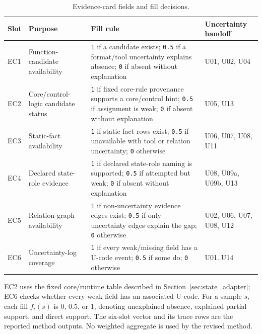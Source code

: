 \documentclass[manuscript,screen,review]{acmart}
\begin{document}
\begin{table}[t]
\centering
\small
\caption{Evidence-card fields and fill decisions.}
\label{tab:s5_1}
\begin{tabularx}{\textwidth}{>{\raggedright\arraybackslash}p{}>{\raggedright\arraybackslash}p{}>{\raggedright\arraybackslash}X>{\raggedright\arraybackslash}p{}}
\toprule
Slot & Purpose & Fill rule & Uncertainty handoff \\
\midrule
EC1 & Function-candidate availability & \texttt{1} if a candidate exists; \texttt{0.5} if a format/tool uncertainty explains absence; \texttt{0} if absent without explanation & U01, U02, U04 \\
EC2 & Core/control-logic candidate status & \texttt{1} if fixed core-rule provenance supports a core/control hint; \texttt{0.5} if assignment is weak; \texttt{0} if absent without explanation & U05, U13 \\
EC3 & Static-fact availability & \texttt{1} if static fact rows exist; \texttt{0.5} if unavailable with tool or relation uncertainty; \texttt{0} otherwise & U06, U07, U08, U11 \\
EC4 & Declared state-role evidence & \texttt{1} if declared state-role naming is supported; \texttt{0.5} if attempted but weak; \texttt{0} if absent without explanation & U08, U09a, U09b, U13 \\
EC5 & Relation-graph availability & \texttt{1} if non-uncertainty evidence edges exist; \texttt{0.5} if only uncertainty edges explain the gap; \texttt{0} otherwise & U02, U06, U07, U08, U12 \\
EC6 & Uncertainty-log coverage & \texttt{1} if every weak/missing field has a U-code event; \texttt{0.5} if some do; \texttt{0} otherwise & U01..U14 \\
\bottomrule
\end{tabularx}
\end{table}

EC2 uses the fixed core/runtime table described in Section~\ref{sec:state_adapter}; EC6 checks whether every weak field has an associated U-code. For a sample $s$, each fill $f_i(s)$ is 0, 0.5, or 1, denoting unexplained absence, explained partial support, and direct support. The six-slot vector and its trace rows are the reported method outputs. No weighted aggregate is used by the revised method.
\end{document}
